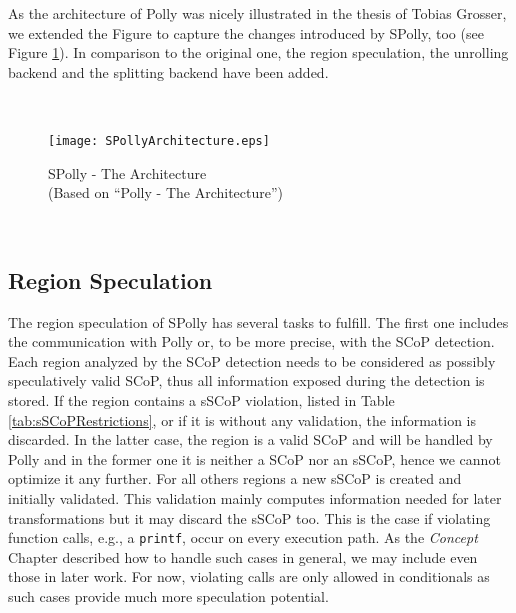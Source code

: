 As the architecture of Polly was nicely illustrated in the thesis of Tobias 
Grosser\cite{grosser:thesis}, we extended the Figure to capture the changes 
introduced by SPolly, too (see Figure \ref{fig:SPollyArchitecture}). 
In comparison to the original one, the region speculation, 
the unrolling backend and the splitting backend have been added. 

\clearpage
~\\
\begin{figure}[htbp]
  \centering
  \texttt{[image: SPollyArchitecture.eps]}
  \caption{SPolly - The Architecture ~\\ (Based on ``Polly - The Architecture''\cite{grosser:thesis})}
  \label{fig:SPollyArchitecture}  
\end{figure}
~\\


\subsection{Region Speculation}
The region speculation  of SPolly has several tasks to fulfill. The first 
one includes the communication with Polly or, to be more precise, 
with the SCoP detection. Each region analyzed by the SCoP detection needs to be
considered as possibly speculatively valid SCoP, thus
all information exposed during the detection is stored.
If the region contains a sSCoP violation, 
listed in Table \ref{tab:sSCoPRestrictions}, or if it is without any validation,
the information is discarded. In the latter case, the region is a valid 
SCoP and will be handled by Polly and in the former one it is neither a SCoP nor 
an sSCoP, hence we cannot optimize it any further.
For all others regions a new sSCoP is created and initially validated. 
This validation mainly computes information needed for later
transformations but it may discard the sSCoP too. This is the case if 
violating function calls, e.g., a \texttt{printf}, occur on every execution path.
As the \textit{Concept} Chapter described how to handle such cases in general,
we may include even those in later work. For now, violating calls
are only allowed in conditionals as such cases provide much more speculation
potential. \\

